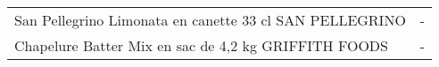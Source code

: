 \begin{longtable}{p{5cm}p{10cm}}
                                                  San Pellegrino Limonata en canette 33 cl SAN PELLEGRINO &                                                                                                                                                                                                                                                                                                                                                                                                                                                                                                                                                                                                                                                                                                                                                                                                                                                                                                                                                                                                                                        - \\
                                                     Chapelure Batter Mix en sac de 4,2 kg GRIFFITH FOODS &                                                                                                                                                                                                                                                                                                                                                                                                                                                                                                                                                                                                                                                                                                                                                                                                                                                                                                                                                                                                                                        - \\

\end{longtable}
